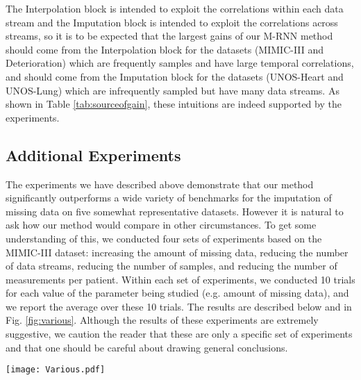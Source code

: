 \documentclass{article}
\begin{document}
The Interpolation block is intended to exploit the correlations within each data stream and the Imputation block is intended to exploit the correlations across streams, so it is to be expected that the largest gains of our M-RNN method should come from the Interpolation block for the datasets (MIMIC-III and Deterioration) which are frequently samples and have large temporal correlations, and should come from the Imputation block for the datasets (UNOS-Heart and UNOS-Lung) which are infrequently sampled but have many data streams.  As shown in Table \ref{tab:sourceofgain}, these intuitions are indeed supported by the experiments.  

\subsection{Additional Experiments}
The experiments we have described above demonstrate that our method significantly outperforms a wide variety of benchmarks for the imputation of missing data on five somewhat representative datasets.  However it is natural to ask how our method would compare in other circumstances.  To get some understanding of this, we conducted four sets of experiments based on the MIMIC-III dataset: increasing the amount of missing data, reducing the number of data streams, reducing the number of samples, and reducing the number of measurements per patient.  Within each set of experiments, we conducted 10 trials for each value of the parameter being studied (e.g. amount of missing data), and we report the average over these 10 trials. The results are described below and in Fig. \ref{fig:various}. Although the results of these experiments are extremely suggestive, we caution the reader that these are only a specific set of experiments and that one should be careful about drawing general conclusions.  

\begin{figure*}[t!]
	\centering
	\texttt{[image: Various.pdf]}
	\caption{Imputation accuracy for the MIMIC-III dataset with various settings (a) Additional data missing at random (top-left), (b) Feature dimensions chosen at random (top-right), (c) Samples chosen at random (bottom-left), (d) Measurements chosen at random  (bottom-right)}
	\label{fig:various}
\end{figure*} 
\end{document}

